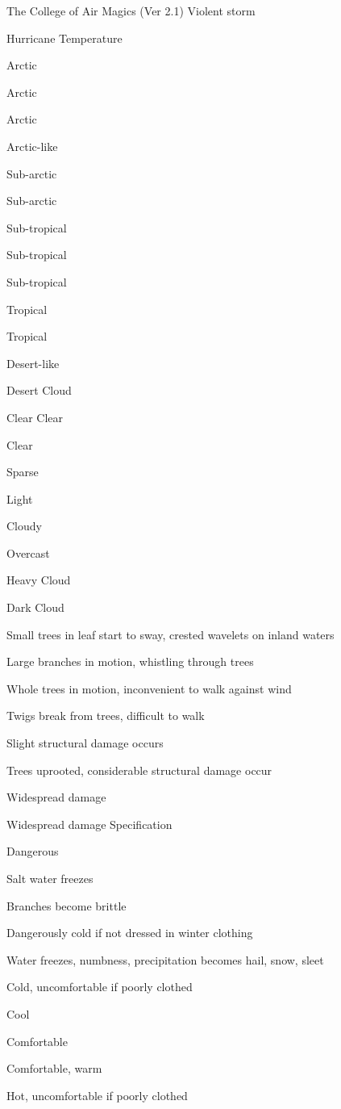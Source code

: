 \begin{Chapter}{The College of Air Magics (Ver 2.1)}
Violent storm 

Hurricane 
Temperature 

Arctic 

Arctic 

Arctic 

Arctic-like 

Sub-arctic 

Sub-arctic 

Sub-tropical 

Sub-tropical 

Sub-tropical 

Tropical 

Tropical 

Desert-like 

Desert 
Cloud 

Clear 
Clear 

Clear 

Sparse 

Light 

Cloudy 

Overcast 

Heavy Cloud 

Dark Cloud 

Small trees in leaf start to sway, crested wavelets on inland waters 

Large branches in motion, whistling through trees 

Whole trees in motion, inconvenient to walk against wind 

Twigs break from trees, difficult to walk 

Slight structural damage occurs 

Trees uprooted, considerable structural damage occur 

Widespread damage 

Widespread damage 
Specification 

Dangerous 

Salt water freezes 

Branches become brittle 

Dangerously cold if not dressed in winter clothing 

Water freezes, numbness, precipitation becomes hail, snow, sleet 

Cold, uncomfortable if poorly clothed 

Cool 

Comfortable 

Comfortable, warm 

Hot, uncomfortable if poorly clothed 


\end{Chapter}

